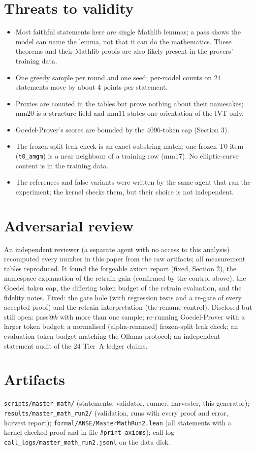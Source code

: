\documentclass[11pt]{article}
\begin{document}
\section{Threats to validity}
\begin{itemize}
\item Most faithful statements here are single Mathlib lemmas; a pass shows the model can name the lemma, not that it can do the mathematics. These theorems and their Mathlib proofs are also likely present in the provers' training data.
\item One greedy sample per round and one seed; per-model counts on 24 statements move by about 4 points per statement.
\item Proxies are counted in the tables but prove nothing about their namesakes; mm20 is a structure field and mm11 states one orientation of the IVT only.
\item Goedel-Prover's scores are bounded by the 4096-token cap (Section 3).
\item The frozen-split leak check is an exact substring match; one frozen T0 item (\texttt{t0\_amgm}) is a near neighbour of a training row (mm17). No elliptic-curve content is in the training data.
\item The references and false variants were written by the same agent that ran the experiment; the kernel checks them, but their choice is not independent.
\end{itemize}

\section{Adversarial review}\label{sec:review}
An independent reviewer (a separate agent with no access to this analysis) recomputed every number in this paper from the raw artifacts; all measurement tables reproduced. It found the forgeable axiom report (fixed, Section 2), the namespace explanation of the retrain gain (confirmed by the control above), the Goedel token cap, the differing token budget of the retrain evaluation, and the fidelity notes. Fixed: the gate hole (with regression tests and a re-gate of every accepted proof) and the retrain interpretation (the rename control). Disclosed but still open: pass@$k$ with more than one sample; re-running Goedel-Prover with a larger token budget; a normalised (alpha-renamed) frozen-split leak check; an evaluation token budget matching the Ollama protocol; an independent statement audit of the 24 Tier~A ledger claims.

\section*{Artifacts}
\texttt{scripts/master\_math/} (statements, validator, runner, harvester, this generator); \texttt{results/master\_math\_run2/} (validation, runs with every proof and error, harvest report); \texttt{formal/ANSE/MasterMathRun2.lean} (all statements with a kernel-checked proof and in-file \texttt{\#print axioms}); call log \texttt{call\_logs/master\_math\_run2.jsonl} on the data disk.
\end{document}
